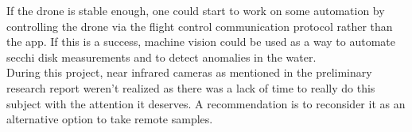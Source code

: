 If the drone is stable enough, one could start to work on some automation by controlling the drone via the flight control communication protocol \cite{splashdronemanual} rather than the app. If this is a success, machine vision could be used as a way to automate secchi disk measurements and to detect anomalies in the water.\\

During this project, near infrared cameras as mentioned in the preliminary research report weren't realized as there was a lack of time to really do this subject with the attention it deserves. A recommendation is to reconsider it as an alternative option to take remote samples.